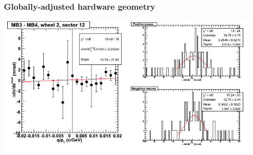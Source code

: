 \documentclass[compress]{beamer}
\begin{document}
\begin{frame}
\frametitle{Globally-adjusted hardware geometry}
\includegraphics[width=\linewidth]{NOV4_segdiffs_HW/dt13_slope_E_12_34.png}
\end{frame}
\end{document}
